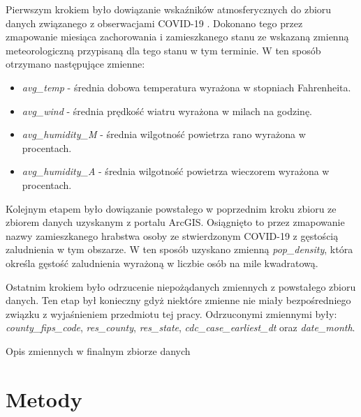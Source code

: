 \documentclass[polish, twoside, 12pt, a4paper]{article}
\theoremstyle{definition}
\theoremstyle{plain}
\theoremstyle{remark}
\begin{document}
Pierwszym krokiem było dowiązanie wskaźników atmosferycznych do zbioru danych związanego z obserwacjami COVID-19 . Dokonano tego przez zmapowanie miesiąca zachorowania i zamieszkanego stanu ze wskazaną zmienną meteorologiczną przypisaną dla tego stanu w tym terminie. W ten sposób otrzymano następujące zmienne:
\begin{itemize}
  \item \emph{avg\_temp} - średnia dobowa temperatura wyrażona w stopniach Fahrenheita.
  \item \emph{avg\_wind} - średnia prędkość wiatru wyrażona w milach na godzinę.
  \item \emph{avg\_humidity\_M} - średnia wilgotność powietrza rano wyrażona w procentach.
  \item \emph{avg\_humidity\_A} - średnia wilgotność powietrza wieczorem wyrażona w procentach.
\end{itemize}

Kolejnym etapem było dowiązanie powstałego w poprzednim kroku zbioru ze zbiorem danych uzyskanym z portalu ArcGIS. Osiągnięto to przez zmapowanie nazwy zamieszkanego hrabstwa osoby ze stwierdzonym COVID-19 z gęstością zaludnienia w tym obszarze. W ten sposób uzyskano zmienną \emph{pop\_density}, która określa gęstość zaludnienia wyrażoną w liczbie osób na mile kwadratową.

Ostatnim krokiem było odrzucenie niepożądanych zmiennych z powstałego zbioru danych. Ten etap był konieczny gdyż niektóre zmienne nie miały bezpośredniego związku z wyjaśnieniem przedmiotu tej pracy. Odrzuconymi zmiennymi były:  \emph{county\_fips\_code},  \emph{res\_county}, \emph{res\_state}, \emph{cdc\_case\_earliest\_dt} oraz \emph{date\_month}.


\begin{table}[H]
  \centering
{}
\caption{Opis zmiennych w finalnym zbiorze danych}
\label{table:zmienne-finalne}
\end{table}

\clearpage
\section{Metody}

\end{document}
